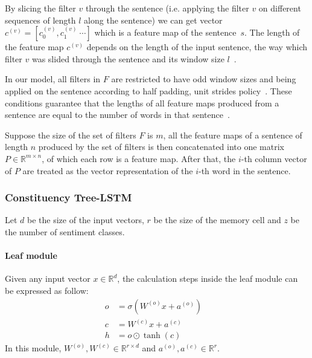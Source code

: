 By slicing the filter \(v\) through the sentence (i.e. applying the filter \(v\) on different sequences of length \(l\) along the sentence) we can get vector \(c^{(v)} = [c^{(v)}_0, c^{(v)}_1~\cdots]\) which is a feature map of the sentence~\(s\).
The length of the feature map \(c^{(v)}\) depends on the length of the input sentence, the way which filter \(v\) was slided through the sentence and its window size \(l\)~\cite{conv-arith}.

In our model, all filters in \(F\) are restricted to have odd window sizes and being applied on the sentence according to half padding, unit strides policy~\cite{conv-arith}.
These conditions guarantee that the lengths of all feature maps produced from a sentence are equal to the number of words in that sentence~\cite{conv-arith}.

Suppose the size of the set of filters \(F\) is \(m\), all the feature maps of a sentence of length \(n\) produced by the set of filters is then concatenated into one matrix \(P \in \mathbb{R}^{m \times n}\), of which each row is a feature map.
After that, the \(i\)-th column vector of \(P\) are treated as the vector representation of the \(i\)-th word in the sentence.
\subsubsection{Constituency Tree-LSTM}\label{treelstm}
Let \(d\) be the size of the input vectors, \(r
\) be the size of the memory cell and \(z\) be the number of sentiment classes.
\paragraph{Leaf module}
Given any input vector \(x \in \mathbb{R}^d\), the calculation steps inside the leaf module can be expressed as follow:
\begin{align}
o &= \sigma{\left( W^{(o)} x + a^{\left(o\right)}\right)} & \\
c &= W^{(c)} x + a^{(c)} & \\
h &= o \odot \tanh{\left(c\right)} &
\end{align}
In this module, \(W^{(o)}, W^{(c)} \in \mathbb{R}^{r \times d}\) and \(a^{\left(o\right)}, a^{(c)} \in \mathbb{R}^r\).
